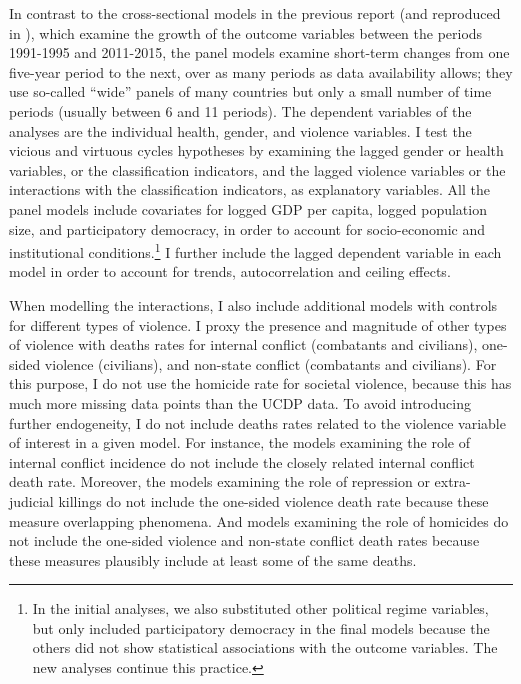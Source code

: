 \documentclass[12pt]{article}
\begin{document}
In contrast to the cross-sectional models in the previous report (and reproduced in ), which examine the growth of the outcome variables between the periods 1991-1995 and 2011-2015, the panel models examine short-term changes from one five-year period to the next, over as many periods as data availability allows; they use so-called \enquote{wide} panels of many countries but only a small number of time periods (usually between 6 and 11 periods).
The dependent variables of the analyses are the individual health, gender, and violence variables.
I test the vicious and virtuous cycles hypotheses by examining the lagged gender or health variables, or the classification indicators, and the lagged violence variables or the interactions with the classification indicators, as explanatory variables.
All the panel models include covariates for logged GDP per capita, logged population size, and participatory democracy, in order to account for socio-economic and institutional conditions.\footnote{In the initial analyses, we also substituted other political regime variables, but only included participatory democracy in the final models because the others did not show statistical associations with the outcome variables. The new analyses continue this practice.}
I further include the lagged dependent variable in each model in order to account for trends, autocorrelation and ceiling effects.

When modelling the interactions, I also include additional models with controls for different types of violence.
I proxy the presence and magnitude of other types of violence with deaths rates for internal conflict (combatants and civilians), one-sided violence (civilians), and non-state conflict (combatants and civilians). For this purpose, I do not use the homicide rate for societal violence, because this has much more missing data points than the UCDP data.
To avoid introducing further endogeneity, I do not include deaths rates related to the violence variable of interest in a given model.
For instance, the models examining the role of internal conflict incidence do not include the closely related internal conflict death rate. Moreover, the models examining the role of repression or extra-judicial killings do not include the one-sided violence death rate because these measure overlapping phenomena. And models examining the role of homicides do not include the one-sided violence and non-state conflict death rates because these measures plausibly include at least some of the same deaths.
\end{document}
